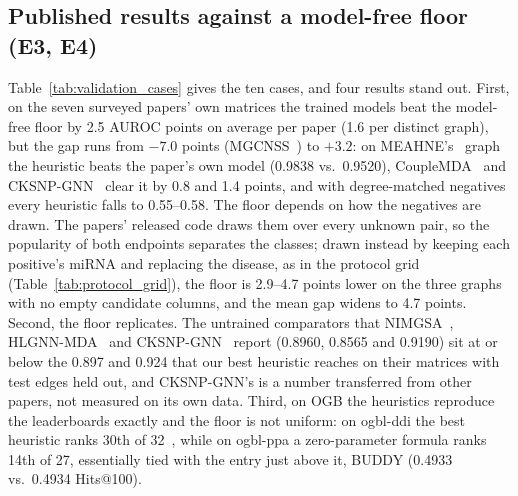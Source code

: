 \documentclass[review]{elsarticle}
\begin{document}
\subsection{Published results against a model-free floor (E3, E4)}
\label{sec:generalization}
Table~\ref{tab:validation_cases} gives the ten cases, and four results stand out. First, on
the seven surveyed papers' own matrices the trained models beat the model-free floor by 2.5
AUROC points on average per paper (1.6 per distinct graph), but the gap runs from $-7.0$
points (MGCNSS~\cite{tian2024mgcnss}) to $+3.2$: on MEAHNE's~\cite{huang2022meahne} graph the heuristic beats the paper's own model
(0.9838 vs.\ 0.9520), CoupleMDA~\cite{li2025couplemda} and CKSNP-GNN~\cite{li2022cksnpgnn} clear it by 0.8 and 1.4 points, and with degree-matched negatives every heuristic falls to
0.55--0.58. The floor depends on how the negatives are drawn. The papers' released code draws them over every
unknown pair, so the popularity of both endpoints separates the classes; drawn instead by keeping each
positive's miRNA and replacing the disease, as in the protocol grid (Table~\ref{tab:protocol_grid}), the
floor is 2.9--4.7 points lower on the three graphs with no empty candidate columns, and the mean gap widens to 4.7 points. Second, the floor
replicates. The untrained comparators that NIMGSA~\cite{jin2022nimgsa}, HLGNN-MDA~\cite{yu2022hlgnnmda}
and CKSNP-GNN~\cite{li2022cksnpgnn} report (0.8960, 0.8565 and 0.9190) sit at or below the 0.897 and 0.924 that our
best heuristic reaches on their matrices with test edges held out, and CKSNP-GNN's
is a number transferred from other papers, not measured on its own data. Third, on OGB the
heuristics reproduce the leaderboards exactly and the floor is not uniform: on ogbl-ddi the
best heuristic ranks 30th of 32~\cite{ogb2026leaderboard}, while on ogbl-ppa a zero-parameter formula ranks 14th of 27,
essentially tied with the entry just above it, BUDDY \cite{chamberlain2023buddy} (0.4933 vs.\
0.4934 Hits@100).
\end{document}
